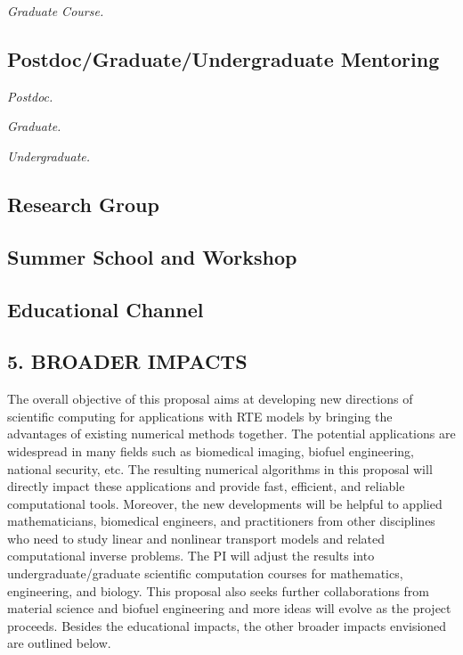 \documentclass[../preamble.tex]{subfiles}
\begin{document}
\noindent \textit{Graduate Course.}

\subsection{Postdoc/Graduate/Undergraduate Mentoring}
\noindent \textit{Postdoc.}

\noindent \textit{Graduate.}

\noindent \textit{Undergraduate.}

\subsection{Research Group}

\subsection{Summer School and Workshop}

\subsection{Educational Channel}

%
%

%
%
\subsection{5. BROADER IMPACTS} %
%
%

The overall objective of this proposal aims at developing new directions of scientific computing for applications with RTE models by bringing the advantages of existing numerical methods together. The potential applications are widespread in many fields such as biomedical imaging, biofuel engineering, national security, etc. The resulting numerical algorithms in this proposal will directly impact these applications and provide fast, efficient, and reliable computational tools. Moreover, the new developments will be helpful to applied mathematicians, biomedical engineers, and practitioners from other disciplines who need to study linear and nonlinear transport models and related computational inverse problems. The PI will adjust the results into undergraduate/graduate scientific computation courses for mathematics, engineering, and biology. This proposal also seeks further collaborations from material science and biofuel engineering and more ideas will evolve as the project proceeds. Besides the educational impacts, the other broader impacts envisioned are outlined below.
\end{document}
